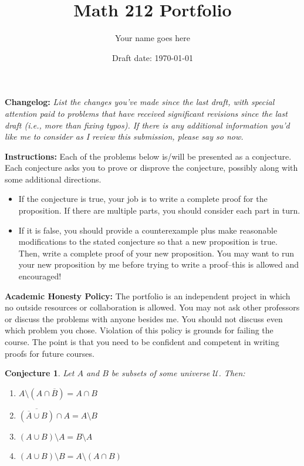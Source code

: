 \documentclass[11pt,titlepage]{article}		%
\title{\sc Math 212 Portfolio}
\author{Your name goes here}
\date{Draft date: \today}
\theoremstyle{theorem}
\newtheorem{conjecture}[theorem]{Conjecture}
\theoremstyle{definition}
\begin{document}
\maketitle


\noindent\textbf{Changelog:} \emph{List the changes you've made since the last draft, with special attention paid to problems that have received significant revisions since the last draft (i.e., more than fixing typos). If there is any additional information you'd like me to consider as I review this submission, please say so now.}

\noindent\textbf{Instructions:} Each of the problems below is/will be presented as a conjecture. Each conjecture asks you to prove or disprove the conjecture, possibly along with some additional directions. 

\bigskip

\begin{itemize}  
	\item If the conjecture is true, your job is to write a complete proof for the proposition. If there are multiple parts, you should consider each part in turn.
	\item If it is false, you should provide a counterexample plus make reasonable modifications to the stated conjecture so that a new proposition is true. Then, write a complete proof of your new proposition. You may want to run your new proposition by me before trying to write a proof--this is allowed and encouraged!
\end{itemize}


\noindent\textbf{Academic Honesty Policy:}
The portfolio is an independent project in which no outside resources or collaboration is allowed. You may not ask other professors or discuss the problems with anyone besides me. You should not discuss even which problem you chose. Violation of this policy is grounds for failing the course. The point is that you need to be confident and competent in writing proofs for future courses.






\clearpage

\begin{conjecture}
	Let $A$ and $B$ be subsets of some universe $\mathcal{U}$.
	Then:
	\begin{enumerate}
		\item $A\setminus (A\cap \overline{B}) = A\cap B$
		\item $\overline{(\overline{A}\cup B)} \cap A = A\setminus B$
		\item $(A\cup B)\setminus A = B\setminus A$
		\item $(A\cup B) \setminus B = A\setminus (A\cap B)$
	\end{enumerate}
\end{conjecture}
\end{document}
